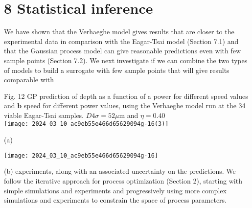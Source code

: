 \documentclass[10pt]{article}
\begin{document}
\section*{8 Statistical inference}
We have shown that the Verhaeghe model gives results that are closer to the experimental data in comparison with the Eagar-Tsai model (Section 7.1) and that the Gaussian process model can give reasonable predictions even with few sample points (Section 7.2). We next investigate if we can combine the two types of models to build a surrogate with few sample points that will give results comparable with

Fig. 12 GP prediction of depth as a function of a power for different speed values and $\mathbf{b}$ speed for different power values, using the Verhaeghe model run at the 34 viable Eagar-Tsai samples. $D 4 \sigma=52 \mu \mathrm{m}$ and $\eta=0.40$\\
\texttt{[image: 2024\_03\_10\_ac9eb55e466d65629094g-16(3)]}

(a)

\begin{center}
\texttt{[image: 2024\_03\_10\_ac9eb55e466d65629094g-16]}
\end{center}

(b) experiments, along with an associated uncertainty on the predictions. We follow the iterative approach for process optimization (Section 2), starting with simple simulations and experiments and progressively using more complex simulations and experiments to constrain the space of process parameters.
\end{document}
